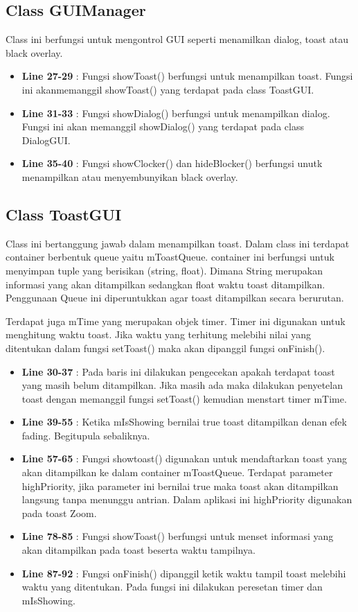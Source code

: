 \documentclass[12pt,a4paper,oneside]{article}
\begin{document}
\subsection{Class GUIManager}
Class ini berfungsi untuk mengontrol GUI seperti menamilkan dialog, toast atau black overlay.
\begin{itemize}
	\item \textbf{Line 27-29} : Fungsi showToast() berfungsi untuk menampilkan toast. Fungsi ini akanmemanggil showToast() yang terdapat pada class ToastGUI.
	\item \textbf{Line 31-33} : Fungsi showDialog() berfungsi untuk menampilkan dialog. Fungsi ini akan memanggil showDialog() yang terdapat pada class DialogGUI.
	\item \textbf{Line 35-40} : Fungsi showClocker() dan hideBlocker() berfungsi unutk menampilkan atau menyembunyikan black overlay. 
\end{itemize}
\subsection{Class ToastGUI}
Class ini bertanggung jawab dalam menampilkan toast. Dalam class ini terdapat container berbentuk queue yaitu mToastQueue. container ini berfungsi untuk menyimpan tuple yang berisikan (string, float). Dimana String merupakan informasi yang akan ditampilkan sedangkan float waktu toast ditampilkan. Penggunaan Queue ini diperuntukkan agar toast ditampilkan secara berurutan. \par
Terdapat juga mTime yang merupakan objek timer. Timer ini digunakan untuk menghitung waktu toast. Jika waktu yang terhitung melebihi nilai yang ditentukan dalam fungsi setToast() maka akan dipanggil fungsi onFinish(). \par
\begin{itemize}
	\item \textbf{Line 30-37} : Pada baris ini dilakukan pengecekan apakah terdapat toast yang masih belum ditampilkan. Jika masih ada maka dilakukan penyetelan toast dengan memanggil fungsi setToast() kemudian menstart timer mTime.
	\item \textbf{Line 39-55} : Ketika mIsShowing bernilai true toast ditampilkan denan efek fading. Begitupula sebaliknya.
	\item \textbf{Line 57-65} : Fungsi showtoast() digunakan untuk mendaftarkan toast yang akan ditampilkan ke dalam container mToastQueue. Terdapat parameter highPriority, jika parameter ini bernilai true maka toast akan ditampilkan langsung tanpa menunggu antrian. Dalam aplikasi ini highPriority digunakan pada toast Zoom.
	\item \textbf{Line 78-85} : Fungsi showToast() berfungsi untuk menset informasi yang akan ditampilkan pada toast beserta waktu tampilnya.
	\item \textbf{Line 87-92} : Fungsi onFinish() dipanggil ketik waktu tampil toast melebihi waktu yang ditentukan. Pada fungsi ini dilakukan peresetan timer dan mIsShowing. 
\end{itemize}
\end{document}

